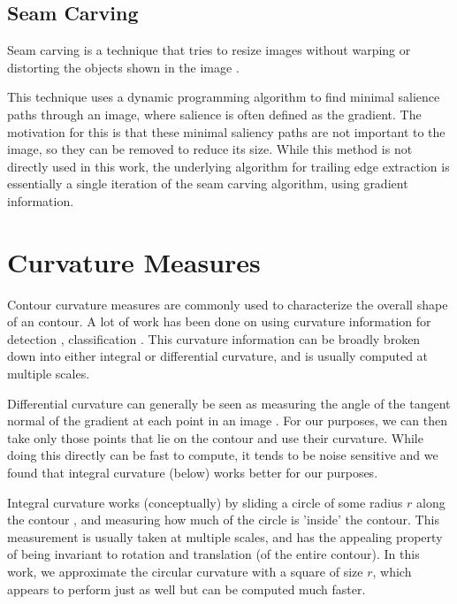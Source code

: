 \subsection{Seam Carving}

Seam carving is a technique that tries to resize images without warping or distorting the objects shown in the image \cite{Avidan:2007:SCC:1276377.1276390}.

This technique uses a dynamic programming algorithm to find minimal salience paths through an image, where salience is often defined as the gradient.
The motivation for this is that these minimal saliency paths are not important to the image, so they can be removed to reduce its size.
While this method is not directly used in this work, the underlying algorithm for trailing edge extraction is essentially a single iteration of the seam carving algorithm, using gradient information.



\section{Curvature Measures}

Contour curvature measures are commonly used to characterize the overall shape of an contour. 
A lot of work has been done on using curvature information for detection \cite{monroy2011beyond}, classification \cite{fischer2014image} \cite{kumar2012leafsnap}. %
This curvature information can be broadly broken down into either integral or differential curvature, and is usually computed at multiple scales.

Differential curvature can generally be seen as measuring the angle of the tangent normal of the gradient at each point in an image \cite{fischer2014image}.
For our purposes, we can then take only those points that lie on the contour and use their curvature.
While doing this directly can be fast to compute, it tends to be noise sensitive and we found that integral curvature (below) works better for our purposes.

Integral curvature works (conceptually) by sliding a circle of some radius $r$ along the contour \cite{pottmann2007integral}, and measuring how much of the circle is 'inside' the contour.
This measurement is usually taken at multiple scales, and has the appealing property of being invariant to rotation and translation (of the entire contour).
In this work, we approximate the circular curvature with a square of size $r$, which appears to perform just as well but can be computed much faster.

